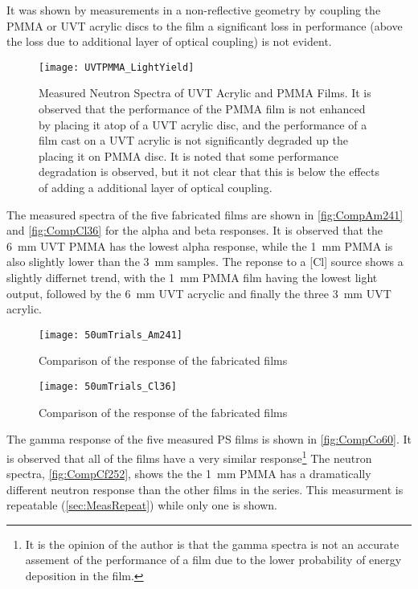 \documentclass[draftcls,onecolumn]{IEEEtran}
\begin{document}
It was shown by measurements in a non-reflective geometry by coupling the PMMA or UVT acrylic discs to the film a significant loss in performance (above the loss due to additional layer of optical coupling) is not evident.
\begin{figure}
  \centering
  \texttt{[image: UVTPMMA\_LightYield]}
  \caption[Measured Effect of UVT acrylic and PMMA]{Measured Neutron Spectra of UVT Acrylic and PMMA Films. It is observed that the performance of the PMMA film is not enhanced by placing it atop of a UVT acrylic disc, and the performance of a film cast on a UVT acrylic is not significantly degraded up the placing it on PMMA disc. It is noted that some performance degradation is observed, but it not clear that this is below the effects of adding a additional layer of optical coupling.}
  \label{fig:RadMeasuredExper}
\end{figure}
The measured spectra of the five fabricated films are shown in \autoref{fig:CompAm241} and \autoref{fig:CompCl36} for the alpha and beta responses.
It is observed that the \SI{6}{\mm} UVT PMMA has the lowest alpha response, while the \SI{1}{\mm} PMMA is also slightly lower than the \SI{3}{\mm} samples.
The reponse to a [Cl] source shows a slightly differnet trend, with the \SI{1}{\mm} PMMA film having the lowest light output, followed by the \SI{6}{\mm} UVT acryclic and finally the three \SI{3}{\mm} UVT acrylic.
\begin{figure}[ht]
  \centering
  \texttt{[image: 50umTrials\_Am241]}
  \caption[Fabricated Film Comparison (Alpha)]{Comparison of the  response of the fabricated films}
  \label{fig:CompAm241}
\end{figure}
\begin{figure}[ht]
  \centering
  \texttt{[image: 50umTrials\_Cl36]}
  \caption[Fabricated Film Comparison (Beta)]{Comparison of the  response of the fabricated films}
  \label{fig:CompCl36}
\end{figure}
The gamma response of the five measured PS films is shown in \autoref{fig:CompCo60}.
It is observed that all of the films have a very similar response\footnote{It is the opinion of the author is that the gamma spectra is not an accurate assement of the performance of a film due to the lower probability of energy deposition in the film.}
The neutron spectra, \autoref{fig:CompCf252}, shows the the \SI{1}{\mm} PMMA has a dramatically different neutron response than the other films in the series.
This measurment is repeatable (\autoref{sec:MeasRepeat}) while only one is shown.
\end{document}
